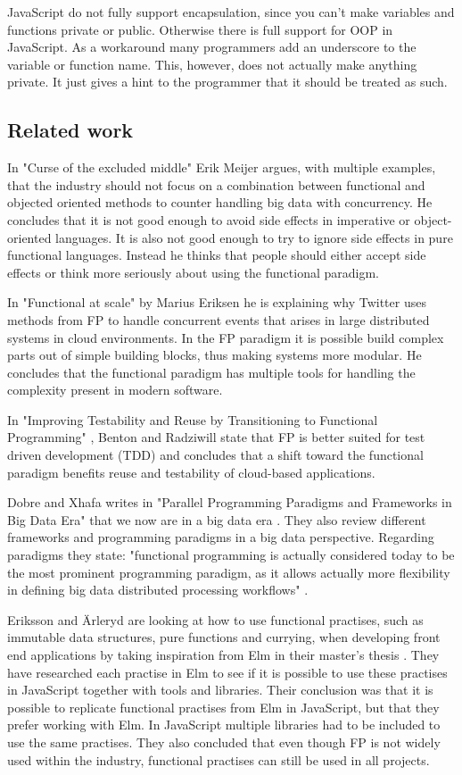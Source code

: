 \documentclass {article}
\begin{document}
JavaScript do not fully support encapsulation, since you can't make variables and functions private or public. Otherwise there is full support for OOP in JavaScript. As a workaround many programmers add an underscore to the variable or function name. This, however, does not actually make anything private. It just gives a hint to the programmer that it should be treated as such.
\subsection{Related work}
In "Curse of the excluded middle" \cite{meijer} Erik Meijer argues, with multiple examples, that the industry should not focus on a combination between functional and objected oriented methods to counter handling big data with concurrency. He concludes that it is not good enough to avoid side effects in imperative or object-oriented languages. It is also not good enough to try to ignore side effects in pure functional languages. Instead he thinks that people should either accept side effects or think more seriously about using the functional paradigm.
 
In "Functional at scale" \cite{eriksen} by Marius Eriksen he is explaining why Twitter uses methods from FP to handle concurrent events that arises in large distributed systems in cloud environments. In the FP paradigm it is possible build complex parts out of simple building blocks, thus making systems more modular. He concludes that the functional paradigm has multiple tools for handling the complexity present in modern software.
 
In "Improving Testability and Reuse by Transitioning to Functional Programming" \cite{benrad}, Benton and Radziwill state that FP is better suited for test driven development (TDD) and concludes that a shift toward the functional paradigm benefits reuse and testability of cloud-based applications.
 
Dobre and Xhafa writes in "Parallel Programming Paradigms and Frameworks in Big Data Era" that we now are in a big data era \cite{dobre}. They also review different frameworks and programming paradigms in a big data perspective. Regarding paradigms they state: "functional programming is actually considered today to be the most prominent programming paradigm, as it allows actually more flexibility in defining big data distributed processing workflows" \cite{dobre}.
 
Eriksson and \"{A}rleryd are looking at how to use functional practises, such as immutable data structures, pure functions and currying, when developing front end applications by taking inspiration from Elm \cite{elm} in their master's thesis \cite{erikarl}. They have researched each practise in Elm to see if it is possible to use these practises in JavaScript together with tools and libraries. Their conclusion was that it is possible to replicate functional practises from Elm in JavaScript, but that they prefer working with Elm. In JavaScript multiple libraries had to be included to use the same practises. They also concluded that even though FP is not widely used within the industry, functional practises can still be used in all projects.
 
\end{document}

